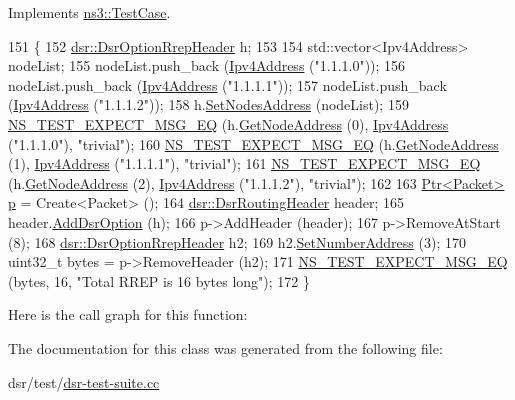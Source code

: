 Implements \hyperlink{classns3_1_1TestCase_a8ff74680cf017ed42011e4be51917a24}{ns3\+::\+Test\+Case}.


\begin{DoxyCode}
151 \{
152   \hyperlink{classns3_1_1dsr_1_1DsrOptionRrepHeader}{dsr::DsrOptionRrepHeader} h;
153 
154   std::vector<Ipv4Address> nodeList;
155   nodeList.push\_back (\hyperlink{classns3_1_1Ipv4Address}{Ipv4Address} (\textcolor{stringliteral}{"1.1.1.0"}));
156   nodeList.push\_back (\hyperlink{classns3_1_1Ipv4Address}{Ipv4Address} (\textcolor{stringliteral}{"1.1.1.1"}));
157   nodeList.push\_back (\hyperlink{classns3_1_1Ipv4Address}{Ipv4Address} (\textcolor{stringliteral}{"1.1.1.2"}));
158   h.\hyperlink{classns3_1_1dsr_1_1DsrOptionRrepHeader_a95a87c4628c000eaa4c1f375f0fe5f8d}{SetNodesAddress} (nodeList);
159   \hyperlink{group__testing_ga7304ba46a28d8cf08dfdfd6499cf7068}{NS\_TEST\_EXPECT\_MSG\_EQ} (h.\hyperlink{classns3_1_1dsr_1_1DsrOptionRrepHeader_a38b71bfabd15610e08eb4c3cc20b5d26}{GetNodeAddress} (0), 
      \hyperlink{classns3_1_1Ipv4Address}{Ipv4Address} (\textcolor{stringliteral}{"1.1.1.0"}), \textcolor{stringliteral}{"trivial"});
160   \hyperlink{group__testing_ga7304ba46a28d8cf08dfdfd6499cf7068}{NS\_TEST\_EXPECT\_MSG\_EQ} (h.\hyperlink{classns3_1_1dsr_1_1DsrOptionRrepHeader_a38b71bfabd15610e08eb4c3cc20b5d26}{GetNodeAddress} (1), 
      \hyperlink{classns3_1_1Ipv4Address}{Ipv4Address} (\textcolor{stringliteral}{"1.1.1.1"}), \textcolor{stringliteral}{"trivial"});
161   \hyperlink{group__testing_ga7304ba46a28d8cf08dfdfd6499cf7068}{NS\_TEST\_EXPECT\_MSG\_EQ} (h.\hyperlink{classns3_1_1dsr_1_1DsrOptionRrepHeader_a38b71bfabd15610e08eb4c3cc20b5d26}{GetNodeAddress} (2), 
      \hyperlink{classns3_1_1Ipv4Address}{Ipv4Address} (\textcolor{stringliteral}{"1.1.1.2"}), \textcolor{stringliteral}{"trivial"});
162 
163   \hyperlink{classns3_1_1Ptr}{Ptr<Packet>} \hyperlink{lte__link__budget_8m_ac9de518908a968428863f829398a4e62}{p} = Create<Packet> ();
164   \hyperlink{classns3_1_1dsr_1_1DsrRoutingHeader}{dsr::DsrRoutingHeader} header;
165   header.\hyperlink{classns3_1_1dsr_1_1DsrOptionField_acd03d07018e22f5e2b23975fae84fb3c}{AddDsrOption} (h);
166   p->AddHeader (header);
167   p->RemoveAtStart (8);
168   \hyperlink{classns3_1_1dsr_1_1DsrOptionRrepHeader}{dsr::DsrOptionRrepHeader} h2;
169   h2.\hyperlink{classns3_1_1dsr_1_1DsrOptionRrepHeader_a3b8e4f3e366a1e43e08c386a38c258d2}{SetNumberAddress} (3);
170   uint32\_t bytes = p->RemoveHeader (h2);
171   \hyperlink{group__testing_ga7304ba46a28d8cf08dfdfd6499cf7068}{NS\_TEST\_EXPECT\_MSG\_EQ} (bytes, 16, \textcolor{stringliteral}{"Total RREP is 16 bytes long"});
172 \}
\end{DoxyCode}


Here is the call graph for this function\+:




The documentation for this class was generated from the following file\+:\begin{DoxyCompactItemize}
\item 
dsr/test/\hyperlink{dsr-test-suite_8cc}{dsr-\/test-\/suite.\+cc}\end{DoxyCompactItemize}
